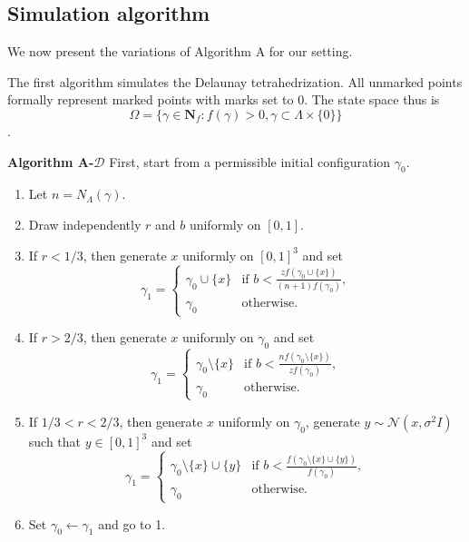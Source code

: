 \subsection{Simulation algorithm}
We now present the variations of Algorithm A for our setting. 

The first algorithm simulates the Delaunay tetrahedrization. All unmarked points formally represent marked points with marks set to $0$. The state space thus is
$$\Omega = \{\gamma \in \mathbf N_f: f(\gamma)>0, \gamma \subset \Lambda\times \{0\}\}$$.

\noindent \textbf{Algorithm A-$\mathcal D$} \newline
\noindent First, start from a permissible initial configuration $\gamma_0$.
\begin{enumerate}
    \item Let $n = N_\Lambda(\gamma)$.
    \item Draw independently $r$ and $b$ uniformly on $[0,1]$.
    \item If $r<1/3$, then generate $x$ uniformly on $[0,1]^3$ and set
        \begin{equation}\label{Dbirth}
        \gamma_1 = 
        \left\{
            \begin{array}{ll}
                \gamma_0 \cup \{x\} & \mbox{if }  b < \frac{z f(\gamma_0 \cup \{x\})}{(n+1)f(\gamma_0)}, \\
                \gamma_0 & \mbox{otherwise. }
            \end{array}
        \right. 
        \end{equation}
    \item If $r>2/3$, then generate $x$ uniformly on $\gamma_0$ and set
        \begin{equation}\label{Ddeath}
        \gamma_1 = 
        \left\{
            \begin{array}{ll}
                \gamma_0 \setminus \{x\} & \mbox{if }  b < \frac{n f(\gamma_0 \setminus \{x\})}{zf(\gamma_0)}, \\
                \gamma_0 & \mbox{otherwise. }
            \end{array}
        \right. 
        \end{equation}
    \item If $1/3 < r < 2/3$, then generate $x$ uniformly on $\gamma_0$, generate $y\sim \mathcal N (x, \sigma^2 I)$ such that $y \in [0,1]^3$ and set
        \begin{equation}\label{Dmove}
        \gamma_1 = 
        \left\{
            \begin{array}{ll}
                \gamma_0 \setminus \{x\} \cup \{y\} & \mbox{if }  b < \frac{f(\gamma_0 \setminus \{x\} \cup \{y\})}{f(\gamma_0)}, \\
                \gamma_0 & \mbox{otherwise. }
            \end{array}
        \right. 
        \end{equation}
    \item Set $\gamma_0 \leftarrow \gamma_1$ and go to 1.
\end{enumerate}

